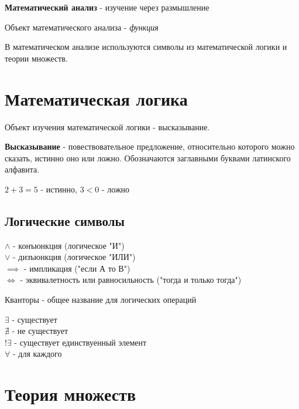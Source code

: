 
\textbf{Математический анализ} - изучение через размышление

Объект математического анализа - \textit{функция}

В математическом анализе используются символы из математической логики и теории множеств.

\section{Математическая логика}

Объект изучения математической логики - высказывание.

\begin{definition}
  \textbf{Высказывание} - повествовательное предложение, относительно которого можно сказать, истинно оно или ложно. Обозначаются заглавными буквами латинского алфавита.
\end{definition}
\begin{eg}
  $2+3=5$ - истинно, $3 < 0$ - ложно
\end{eg}

\subsection{Логические символы}

\begin{itemize}
  $\land$ - конъюнкция (логическое "И")\\
  $\lor$ - дизъюнкция (логическое "ИЛИ")\\
  $\implies$ - импликация ("если А то В")\\
  $\iff$ - эквивалетность или равносильность ("тогда и только тогда")\\
\end{itemize}

Кванторы - общее название для логических операций

\begin{itemize}
  $\exists$ - существует\\
  $\nexists$ - не существует\\
  $!\exists$ - существует единствуенный элемент\\
  $\forall$ - для каждого\\
\end{itemize}

\section{Теория множеств}

